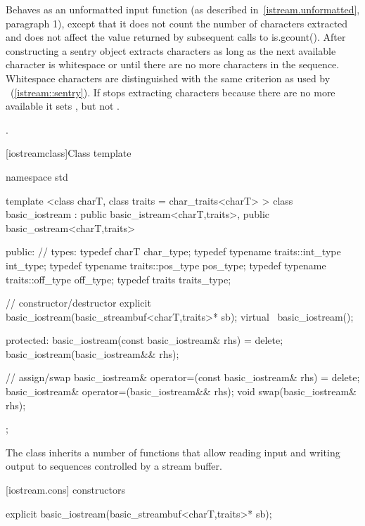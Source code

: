 \begin{itemdescr}
\pnum
\effects
Behaves as an unformatted input function (as described in~\ref{istream.unformatted},
paragraph 1), except that it does not count the number of characters extracted and
does not affect the value returned by subsequent calls to is.gcount(). After
constructing a sentry object extracts characters as long as the next available
character  is whitespace or until there are no more characters in the sequence.
Whitespace characters are distinguished with the same criterion as used by
~(\ref{istream::sentry}).
If
stops extracting characters because there are no more available it sets
,
but not
.

\pnum
\returns
{}.
\end{itemdescr}

[iostreamclass]{Class template }

%
\begin{codeblock}
namespace std {
  template <class charT, class traits = char_traits<charT> >
  class basic_iostream :
    public basic_istream<charT,traits>,
    public basic_ostream<charT,traits> {
  public:
    // types:
    typedef charT                     char_type;
    typedef typename traits::int_type int_type;
    typedef typename traits::pos_type pos_type;
    typedef typename traits::off_type off_type;
    typedef traits                    traits_type;

    // constructor/destructor
    explicit basic_iostream(basic_streambuf<charT,traits>* sb);
    virtual ~basic_iostream();

  protected:
    basic_iostream(const basic_iostream& rhs) = delete;
    basic_iostream(basic_iostream&& rhs);

    // assign/swap
    basic_iostream& operator=(const basic_iostream& rhs) = delete;
    basic_iostream& operator=(basic_iostream&& rhs);
    void swap(basic_iostream& rhs);
  };
}
\end{codeblock}

\pnum
The class
inherits a number of functions that allow reading input and writing output to
sequences controlled by a stream buffer.
%

[iostream.cons]{ constructors}

%
\begin{itemdecl}
explicit basic_iostream(basic_streambuf<charT,traits>* sb);
\end{itemdecl}


